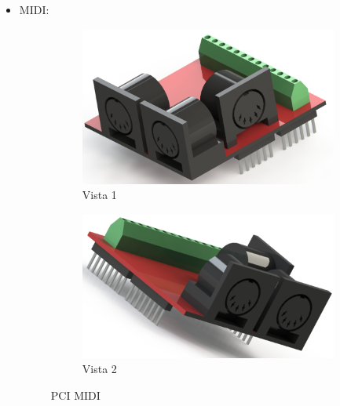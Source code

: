             \begin{itemize}
                \item {} MIDI:

                    \begin{figure}[H]
                        \centering
                        \begin{subfigure}{.5\textwidth}
                          \centering
                          \includegraphics[scale=0.2]{Imagens/SW_Images/midi_shield1.png}
                          \caption{Vista 1}
                          \label{fig:MIDI_SHIELD_1}
                        \end{subfigure}%
                        \begin{subfigure}{.5\textwidth}
                          \centering
                          \includegraphics[scale=0.2]{Imagens/SW_Images/midi_shield2.png}
                          \caption{Vista 2}
                          \label{fig:MIDI_SHIELD_2}
                        \end{subfigure}
                        \caption{PCI MIDI}
                        \label{fig:MIDI_SHIELD}
                    \end{figure}


\end{itemize}
